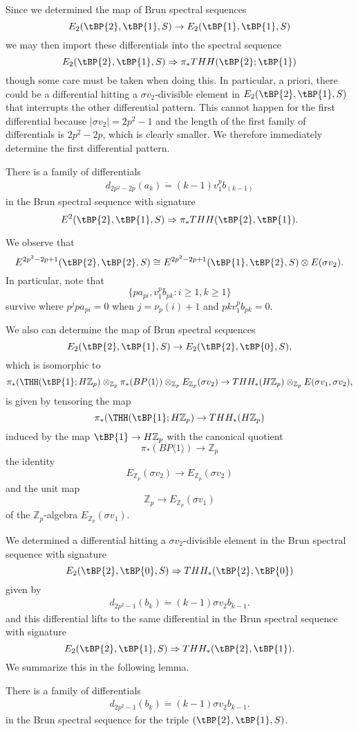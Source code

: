 Since we determined the map of Brun spectral sequences 
\[ E_2(\tBP{2},\tBP{1},S)\to E_2(\tBP{1},\tBP{1},S)\]
we may then import these differentials into the spectral sequence 
\[ E_2(\tBP{2},\tBP{1},S)\Rightarrow \pi_*THH(\tBP{2};\tBP{1}) \]
though some care must be taken when doing this. In particular, a priori, there could be a differential hitting a $\sigma v_2$-divisible element in $E_2(\tBP{2},\tBP{1},S)$ that interrupts the other differential pattern. This cannot happen for the first differential because $|\sigma v_2|=2p^2-1$ and the length of the first family of differentials is $2p^2-2p$, which is clearly smaller. We therefore immediately determine the first differential pattern. 
\begin{lem}
There is a family of differentials 
\begin{align}\label{AHL diff Brun filt} 
d_{2p^2-2p}(a_{k})\dot{=}(k-1)v_1^{p}b_{(k-1)} 
\end{align}
in the Brun spectral sequence with signature
\[ E^{2}(\tBP{2},\tBP{1},S)\Rightarrow \pi_*THH(\tBP{2},\tBP{1}).\]
\end{lem}
We observe that 
\[ E^{2p^2-2p+1}(\tBP{2},\tBP{2},S)\cong E^{2p^2-2p+1}(\tBP{1},\tBP{2},S)\otimes E(\sigma v_2). \]
In particular, note that 
\[ \{ pa_{pi}, v_1^pb_{pk} : i\ge 1 , k\ge 1\} \]
survive where $p^{j}pa_{pi}=0$ when $j=\nu_p(i)+1$ and $pkv_1^pb_{pk}=0$. 

We also can determine the map of Brun spectral sequences
\[ E_2(\tBP{2},\tBP{1},S)\to E_2(\tBP{2},\tBP{0},S),\]
which is isomorphic to
\[ \pi_*(\THH(\tBP{1};H\mathbb{Z}_p)\otimes_{\mathbb{Z}_p} \pi_*(BP\langle 1\rangle )\otimes_{\mathbb{Z}_p} E_{\mathbb{Z}_p}(\sigma v_2)\to  THH_*(H\mathbb{Z}_p)\otimes_{\mathbb{Z}_p}E(\sigma v_1,\sigma v_2), \]
is given by tensoring the map 
\[\pi_*(\THH(\tBP{1};H\mathbb{Z}_p)\to THH_*(H\mathbb{Z}_p)\]
induced by the map $\tBP{1}\to H\mathbb{Z}_p$ with the canonical quotient
\[\pi_*(BP\langle 1\rangle )\to \mathbb{Z}_p \]
the identity 
\[E_{\mathbb{Z}_p}(\sigma v_2)\to E_{\mathbb{Z}_p}(\sigma v_2)\]
and the unit map 
\[ \mathbb{Z}_p\to E_{\mathbb{Z}_p}(\sigma v_1) \]
of the $\mathbb{Z}_p$-algebra $E_{\mathbb{Z}_p}(\sigma v_1)$.

We determined a differential hitting a $\sigma v_2$-divisible element in the Brun spectral sequence with signature 
\[ E_2(\tBP{2},\tBP{0},S)\Rightarrow THH_*(\tBP{2},\tBP{0})\]
given by 
\begin{align*}
d_{2p^2-1}(b_k)\dot{=}(k-1)\sigma v_2 b_{k-1}.
\end{align*}
and this differential lifts to the same differential in the Brun spectral sequence with signature
\[E_2(\tBP{2},\tBP{1},S)\Rightarrow THH_*(\tBP{2},\tBP{1}).\]
We summarize this in the following lemma.
\begin{lem}
There is a family of differentials
\begin{align}\label{first diff pattern b}
d_{2p^2-1}(b_k)\dot{=}(k-1)\sigma v_2 b_{k-1}.
\end{align}
in the Brun spectral sequence for the triple $(\tBP{2},\tBP{1},S)$. 
\end{lem}

